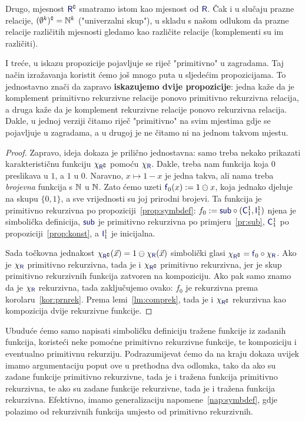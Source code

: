 Drugo, mjesnost  $\f R\kompl$ smatramo istom kao mjesnost od $\f R$. Čak i u slučaju prazne relacije, $(\emptyset^k)\sp{{\scriptscriptstyle\complement}}={\mathbb N}^k$ ("univerzalni skup"), u skladu s našom odlukom da prazne relacije različitih mjesnosti gledamo kao različite relacije (komplementi su im različiti).

I treće, u iskazu propozicije pojavljuje se riječ "primitivno" u zagradama. Taj način izražavanja koristit ćemo još mnogo puta u sljedećim propozicijama. To jednostavno znači da zapravo \textbf{iskazujemo dvije propozicije}: jedna kaže da je komplement primitivno rekurzivne relacije ponovo primitivno rekurzivna relacija, a druga kaže da je komplement rekurzivne relacije ponovo rekurzivna relacija. Dakle, u jednoj verziji čitamo riječ "primitivno" na svim mjestima gdje se pojavljuje u zagradama, a u drugoj je ne čitamo ni na jednom takvom mjestu.

\begin{proof}
Zapravo, ideja dokaza je prilično jednostavna: samo treba nekako prikazati karakterističnu funkciju $\chi_{\f R\kompl}$ pomoću $\chi_{\f R}$. Dakle, treba nam funkcija koja $0$ preslikava u $1$, a $1$ u $0$. Naravno, $x\mapsto1-x$ je jedna takva, ali nama treba \emph{brojevna} funkcija s ${\mathbb N}$ u ${\mathbb N}$. Zato ćemo uzeti $\f f_0(x):=1\ominus x$, koja jednako djeluje na skupu $\{0,1\}$, a sve vrijednosti su joj prirodni brojevi. Ta funkcija je primitivno rekurzivna po propoziciji~\ref{prop:symbdef}: $f_0:=\f{sub}\circ(\f C_1^1,\f I_1^1)$ njena je simbolička definicija, $\f{sub}$ je primitivno rekurzivna po primjeru~\ref{pr:sub}, $\f C_1^1$ po propoziciji~\ref{prop:konst}, a $\f I_1^1$ je inicijalna.

Sada točkovna jednakost $\chi_{\f R\kompl}(\vec x)=1\ominus\chi_{\f R}(\vec x)$ simbolički glasi $\chi_{\f R\kompl}=\f f_0\circ\chi_{\f R}$. Ako je $\chi_{\f R}$ primitivno rekurzivna, tada je i $\chi_{\f R\kompl}$ primitivno rekurzivna, jer je skup primitivno rekurzivnih funkcija zatvoren na kompoziciju.
Ako pak samo znamo da je $\chi_{\f R}$ rekurzivna, tada zaključujemo ovako: $f_0$ je rekurzivna prema korolaru~\ref{kor:prnrek}. Prema lemi~\ref{lm:comprek}, tada je i $\chi_{\f R\kompl}$ rekurzivna kao kompozicija dvije rekurzivne funkcije.
\end{proof}

Ubuduće ćemo samo napisati simboličku definiciju tražene funkcije iz zadanih funkcija, koristeći neke pomoćne primitivno rekurzivne funkcije, te kompoziciju i eventualno primitivnu rekurziju. Podrazumijevat ćemo da na kraju dokaza uvijek imamo argumentaciju poput ove u prethodna dva odlomka, tako da ako su zadane funkcije primitivno rekurzivne, tada je i tražena funkcija primitivno rekurzivna, te ako su zadane funkcije rekurzivne, tada je i tražena funkcija rekurzivna. Efektivno, imamo generalizaciju napomene~\ref{nap:symbdef}, gdje polazimo od rekurzivnih funkcija umjesto od primitivno rekurzivnih.

